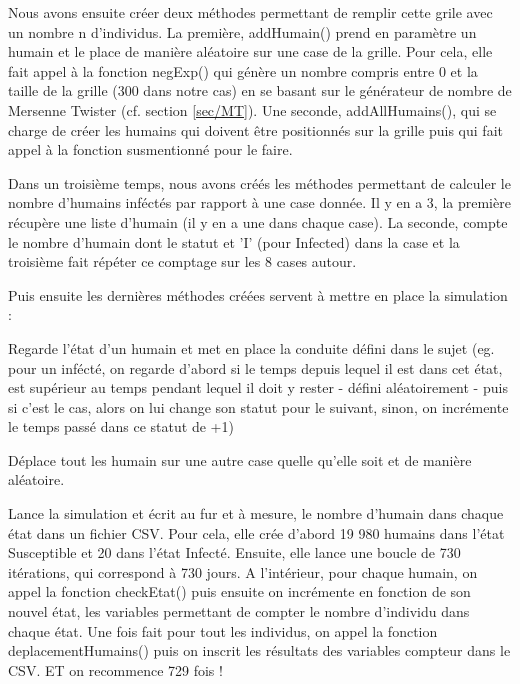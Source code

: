 \documentclass[french]{article}
\begin{document}
Nous avons ensuite créer deux méthodes permettant de remplir cette grile avec un nombre n d'individus. La première, addHumain() prend en paramètre un humain et le place de manière aléatoire sur une case de la grille. Pour cela, elle fait appel à la fonction negExp() qui génère un nombre compris entre 0 et la taille de la grille (300 dans notre cas) en se basant sur le générateur de nombre de Mersenne Twister (cf. section \ref{sec/MT}). Une seconde, addAllHumains(), qui se charge de créer les humains qui doivent être positionnés sur la grille puis qui fait appel à la fonction susmentionné pour le faire.



Dans un troisième temps, nous avons créés les méthodes permettant de calculer le nombre d'humains inféctés par rapport à une case donnée. Il y en a 3, la première récupère une liste d'humain (il y en a une dans chaque case). La seconde, compte le nombre d'humain dont le statut et 'I' (pour Infected) dans la case et la troisième fait répéter ce comptage sur les 8 cases autour.



\noindent Puis ensuite les dernières méthodes créées servent à mettre en place la simulation :

\begin{description} \label{liste/descMéthode}
\item[checkEtat] Regarde l'état d'un humain et met en place la conduite défini dans le sujet (eg. pour un infécté, on regarde d'abord si le temps depuis lequel il est dans cet état, est supérieur au temps pendant lequel il doit y rester - défini aléatoirement - puis si c'est le cas, alors on lui change son statut pour le suivant, sinon, on incrémente le temps passé dans ce statut de +1)
\item[deplacementHumains] Déplace tout les humain sur une autre case quelle qu'elle soit et de manière aléatoire.
\item[simulation] Lance la simulation et écrit au fur et à mesure, le nombre d'humain dans chaque état dans un fichier CSV. Pour cela, elle crée d'abord 19 980 humains dans l'état Susceptible et 20 dans l'état Infecté. Ensuite, elle lance une boucle de 730 itérations, qui correspond à 730 jours. A l'intérieur, pour chaque humain, on appel la fonction checkEtat() puis ensuite on incrémente en fonction de son nouvel état, les variables permettant de compter le nombre d'individu dans chaque état. Une fois fait pour tout les individus, on appel la fonction deplacementHumains() puis on inscrit les résultats des variables compteur dans le CSV. ET on recommence 729 fois !
\end{description}
\end{document}
